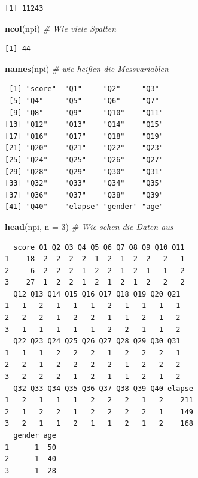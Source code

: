 \documentclass[12pt,]{tufte-book}
\newenvironment{Shaded}{\begin{snugshade}}{\end{snugshade}}
\newcommand{\KeywordTok}[1]{\textcolor[rgb]{0.13,0.29,0.53}{\textbf{#1}}}
\newcommand{\DataTypeTok}[1]{\textcolor[rgb]{0.13,0.29,0.53}{#1}}
\newcommand{\DecValTok}[1]{\textcolor[rgb]{0.00,0.00,0.81}{#1}}
\newcommand{\CommentTok}[1]{\textcolor[rgb]{0.56,0.35,0.01}{\textit{#1}}}
\newcommand{\NormalTok}[1]{#1}
\theoremstyle{definition}
\theoremstyle{definition}
\theoremstyle{definition}
\theoremstyle{remark}
\begin{document}
\begin{verbatim}
[1] 11243
\end{verbatim}

\begin{Shaded}
\begin{Highlighting}[]
\KeywordTok{ncol}\NormalTok{(npi)  }\CommentTok{# Wie viele Spalten}
\end{Highlighting}
\end{Shaded}

\begin{verbatim}
[1] 44
\end{verbatim}

\begin{Shaded}
\begin{Highlighting}[]
\KeywordTok{names}\NormalTok{(npi)  }\CommentTok{# wie heißen die Messvariablen}
\end{Highlighting}
\end{Shaded}

\begin{verbatim}
 [1] "score"  "Q1"     "Q2"     "Q3"    
 [5] "Q4"     "Q5"     "Q6"     "Q7"    
 [9] "Q8"     "Q9"     "Q10"    "Q11"   
[13] "Q12"    "Q13"    "Q14"    "Q15"   
[17] "Q16"    "Q17"    "Q18"    "Q19"   
[21] "Q20"    "Q21"    "Q22"    "Q23"   
[25] "Q24"    "Q25"    "Q26"    "Q27"   
[29] "Q28"    "Q29"    "Q30"    "Q31"   
[33] "Q32"    "Q33"    "Q34"    "Q35"   
[37] "Q36"    "Q37"    "Q38"    "Q39"   
[41] "Q40"    "elapse" "gender" "age"   
\end{verbatim}

\begin{Shaded}
\begin{Highlighting}[]
\KeywordTok{head}\NormalTok{(npi, }\DataTypeTok{n =} \DecValTok{3}\NormalTok{)  }\CommentTok{# Wie sehen die Daten aus}
\end{Highlighting}
\end{Shaded}

\begin{verbatim}
  score Q1 Q2 Q3 Q4 Q5 Q6 Q7 Q8 Q9 Q10 Q11
1    18  2  2  2  2  1  2  1  2  2   2   1
2     6  2  2  2  1  2  2  1  2  1   1   2
3    27  1  2  2  1  2  1  2  1  2   2   2
  Q12 Q13 Q14 Q15 Q16 Q17 Q18 Q19 Q20 Q21
1   1   2   1   1   1   2   1   1   1   1
2   2   2   1   2   2   1   1   2   1   2
3   1   1   1   1   1   2   2   1   1   2
  Q22 Q23 Q24 Q25 Q26 Q27 Q28 Q29 Q30 Q31
1   1   1   2   2   2   1   2   2   2   1
2   2   1   2   2   2   2   1   2   2   2
3   2   2   2   1   2   1   1   2   1   2
  Q32 Q33 Q34 Q35 Q36 Q37 Q38 Q39 Q40 elapse
1   2   1   1   1   2   2   2   1   2    211
2   1   2   2   1   2   2   2   2   1    149
3   2   1   1   2   1   1   2   1   2    168
  gender age
1      1  50
2      1  40
3      1  28
\end{verbatim}
\end{document}
